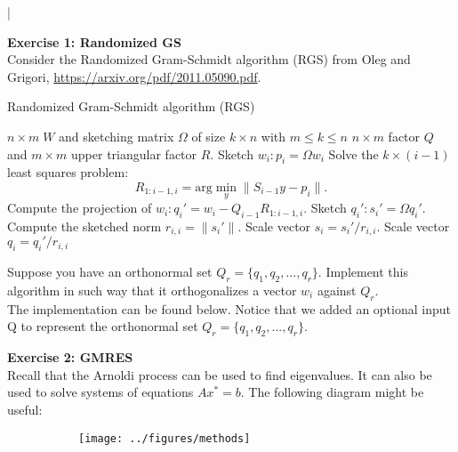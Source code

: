 \documentclass[11pt]{article}
\begin{document}
\lstset{frameround=fttt,language=Matlab}

\lstMakeShortInline[columns=fixed]|



{\bf{Exercise 1: Randomized GS}} \\

Consider the Randomized Gram-Schmidt algorithm (RGS) from Oleg and Grigori, \url{https://arxiv.org/pdf/2011.05090.pdf}.

\scriptsize
\begin{algorithm}
\caption{Randomized Gram-Schmidt algorithm (RGS)}\label{RGS}
\begin{algorithmic}
\Input $n \times m \; W$ and sketching matrix $\Omega$ of size $k \times n$ with $m \leq k \leq n$
\Output $n \times m$ factor $Q$ and $m \times m$ upper triangular factor $R$.
    \State Sketch $w_i: p_i = \Omega w_i$
    \State Solve the $k \times (i-1)$ least squares problem:
    \[ R_{1:i-1, i} = \text{arg}\min_{y} \|S_{i-1}y - p_i\|. \]
    \State Compute the projection of $w_i: q_i' = w_i - Q_{i-1}R_{1:i-1, i}$.
    \State Sketch $q_i' : s_i' = \Omega q_i'$.
    \State Compute the sketched norm $r_{i,i} = \|s_i'\|$.
    \State Scale vector $s_i = s_i'/r_{i,i}$.
    \State Scale vector $q_i = q_i'/r_{i,i}$
\EndFor
\end{algorithmic}
\end{algorithm}
\normalsize

Suppose you have an orthonormal set $Q_r = \{q_1, q_2, ..., q_r\}$. Implement this algorithm in such way that it orthogonalizes a vector $w_i$ against $Q_r$. \\

The implementation can be found below. Notice that we added an optional input Q to represent the orthonormal set $Q_r = \{q_1, q_2, ..., q_r\}$.



\bigskip

{\bf{Exercise 2: GMRES}} \\

Recall that the Arnoldi process can be used to find eigenvalues. It can also be used to solve systems of equations $Ax^* = b$. The following diagram might be useful:

\begin{figure}[H]
     \centering
     \begin{subfigure}[b]{0.5\textwidth}
         \centering
         \texttt{[image: ../figures/methods]}
     \end{subfigure}
\end{figure}
\end{document}
